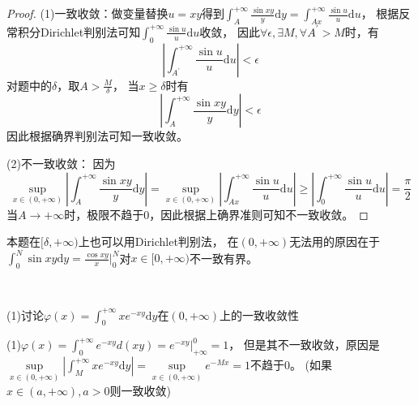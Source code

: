 \begin{proof}
  (1)一致收敛：做变量替换$u = xy$得到$\int_A^{+\infty} \frac{\sin xy}{y}\mathrm{d} y = \int_{Ax}^{+\infty} \frac{\sin u}{u}\mathrm{d} u$，
  根据反常积分Dirichlet判别法可知$\int_0^{+\infty} \frac{\sin u}{u}\mathrm{d}u $收敛，
  因此$\forall \epsilon, \exists M, \forall A^{\prime} > M$时，有
  \begin{equation*}
    \left| \int_{A^{\prime}}^{+\infty} \frac{ \sin u}{u}\mathrm{d} u \right| < \epsilon
  \end{equation*}
  对题中的$\delta$，取$A > \frac{M}{\delta}$，
  当$x \geq \delta$时有
  \begin{equation*}
    \left| \int_A^{+\infty} \frac{\sin xy}{y}\mathrm{d}y \right|< \epsilon
  \end{equation*}
  因此根据确界判别法可知一致收敛。

  (2)不一致收敛：
  因为
  \begin{equation*}
    \sup \limits_{x \in (0,+\infty)} \left| \int_A^{+\infty} \frac{\sin xy}{y}\mathrm{d} y \right| = \sup \limits_{x \in (0,+\infty)} \left| \int_{Ax}^{+\infty } \frac{\sin u}{u}\mathrm{d} u \right| \geq \left| \int_0^{+\infty} \frac{\sin u}{u}\mathrm{d} u \right| = \frac{\pi}{2}
  \end{equation*}
  当$A \rightarrow +\infty$时，极限不趋于$0$，因此根据上确界准则可知不一致收敛。
\end{proof}

\begin{note}
  本题在$[\delta,+\infty)$上也可以用Dirichlet判别法，
  在$(0,+\infty)$无法用的原因在于$\int_0^N \sin xy \mathrm{d} y = \frac{\cos xy}{x} \bigg|_0^N$对$x \in [0,+\infty)$不一致有界。
\end{note}

~

\begin{exercise}[不一致收敛例子]
  (1)讨论$\varphi(x) = \int _0^{+\infty}x e^{-xy}\mathrm{d}y$在$(0,+\infty)$上的一致收敛性
\end{exercise}

\begin{solution}
  (1)$\varphi(x) = \int_0^{+\infty}e^{-xy}d(xy) = e^{-xy}|_{+\infty}^0 = 1$，
  但是其不一致收敛，原因是$\sup \limits_{x \in (0,+\infty)}|\int_M^{+\infty}xe^{-xy}\mathrm{d}y| 
  = \sup \limits_{x \in (0,+\infty)} e^{-Mx} = 
  1$不趋于$0$。
  (如果$x \in (a,+\infty), a > 0$则一致收敛)
\end{solution}

~

